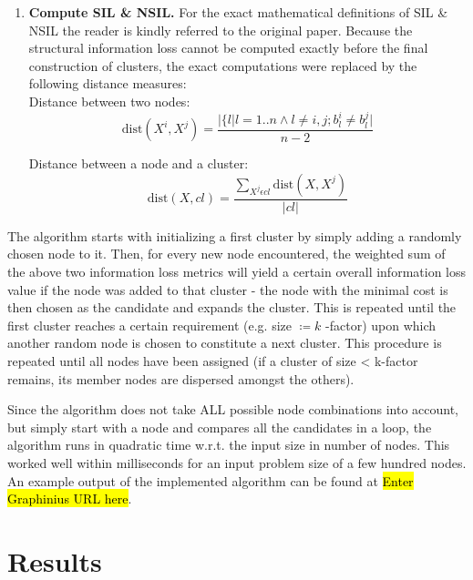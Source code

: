 \documentclass{llncs}
\providecommand{\abs}[1]{\lvert#1\rvert}
\begin{document}
\begin{enumerate}
	\item \textbf{Compute SIL \& NSIL.} For the exact mathematical definitions of SIL \& NSIL the reader is kindly referred to the original paper. Because the structural information loss cannot be computed exactly before the final construction of clusters, the exact computations were replaced by the following distance measures: \\
	Distance between two nodes:
	\begin{equation*}
	\text{dist}(X^i, X^j) = \frac{\abs{\{l|l=1..n \wedge l \ne i,j;b_l^i \ne b_l^j}}{n-2}
	\end{equation*}
	
	Distance between a node and a cluster:
	\begin{equation*}
	\text{dist}(X, cl) = \frac{\sum_{X^j \epsilon cl} \text{dist}(X, X^j) }{\abs{cl}}
	\end{equation*}
\end{enumerate}

The algorithm starts with initializing a first cluster by simply adding a randomly chosen node to it. Then, for every new node encountered, the weighted sum of the above two information loss metrics will yield a certain overall information loss value if the node was added to that cluster - the node with the minimal cost is then chosen as the candidate and expands the cluster. This is repeated until the first cluster reaches a certain requirement (e.g. size $ \coloneqq  k $ -factor) upon which another random node is chosen to constitute a next cluster. This procedure is repeated until all nodes have been assigned (if a cluster of size < k-factor remains, its member nodes are dispersed amongst the others). 

Since the algorithm does not take ALL possible node combinations into account, but simply start with a node and compares all the candidates in a loop, the algorithm runs in quadratic time w.r.t. the input size in number of nodes. This worked well within milliseconds for an input problem size of a few hundred nodes. An example output of the implemented algorithm can be found at \hl{Enter Graphinius URL here}. \\


\section{Results}
\label{sect:results}
\end{document}
